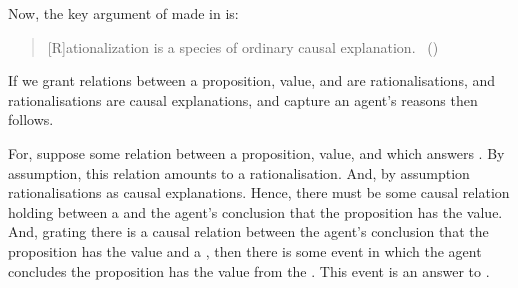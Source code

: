 \begin{note}
  Now, the key argument of made in  is:
  \begin{quote}
    [R]ationalization is a species of ordinary causal explanation.\newline
    \mbox{ }\hfill\mbox{(\citeyear[685]{Davidson:1963aa})}
  \end{quote}

  If we grant relations between a proposition, value, and  are rationalisations, and rationalisations are causal explanations, and  capture an agent's reasons then \issueInclusion{} follows.

  For, suppose some relation between a proposition, value, and \pool{} which answers \qWhy{}.
  By assumption, this relation amounts to a rationalisation.
  And, by assumption rationalisations as causal explanations.
  Hence, there must be some causal relation holding between a  and the agent's conclusion that the proposition has the value.
  And, grating there is a causal relation between the agent's conclusion that the proposition has the value and a , then there is some event in which the agent concludes the proposition has the value from the .
  This event is an answer to \qHow{}.
\end{note}

